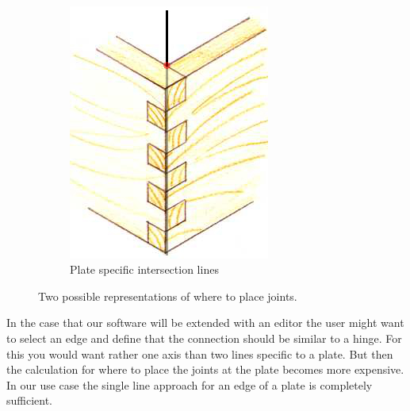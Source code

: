 \documentclass[../ClassicThesis.tex]{subfiles}
\begin{document}
\begin{figure}
\begin{subfigure}[b]{0.45\textwidth}
\end{subfigure}
~
\begin{subfigure}[b]{0.45\textwidth}
\includegraphics[width=\columnwidth]{Images/woodenFingers2.jpg}
\caption{Plate specific intersection lines}
\end{subfigure}
\caption{Two possible representations of where to place joints.}
    \label{fig:hinges}
\end{figure}
In the case that our software will be extended with an editor the user might want to select an edge and define that the connection should be similar to a hinge. For this you would want rather one axis than two lines specific to a plate. But then the calculation for where to place the joints at the plate becomes more expensive.\\
In our use case the single line approach for an edge of a plate is completely sufficient.
\end{document}
